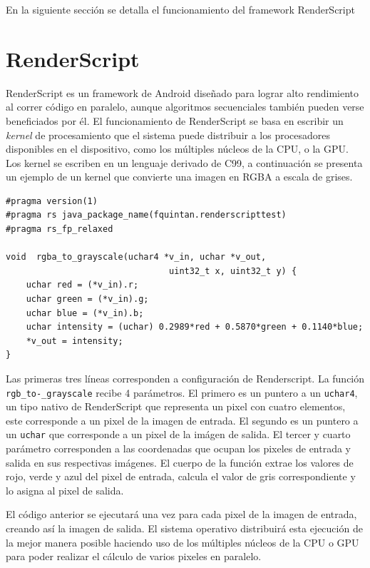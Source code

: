 En la siguiente sección se detalla el funcionamiento del framework RenderScript

\section{RenderScript}\label{renderscript}
RenderScript es un framework de Android diseñado para lograr alto rendimiento al correr código en paralelo, aunque algoritmos secuenciales también pueden verse beneficiados por él. El funcionamiento de RenderScript se basa en escribir un \emph{kernel} de procesamiento que el sistema puede distribuir a los procesadores disponibles en el dispositivo, como los múltiples núcleos de la CPU, o la GPU. 
Los kernel se escriben en un lenguaje derivado de C99, a continuación se presenta un ejemplo de un kernel que convierte una imagen en RGBA a escala de grises.

\begin{lstlisting}[style=CInputStyle]
#pragma version(1)
#pragma rs java_package_name(fquintan.renderscripttest)
#pragma rs_fp_relaxed

void  rgba_to_grayscale(uchar4 *v_in, uchar *v_out,
                                uint32_t x, uint32_t y) {
    uchar red = (*v_in).r;
    uchar green = (*v_in).g;
    uchar blue = (*v_in).b;
    uchar intensity = (uchar) 0.2989*red + 0.5870*green + 0.1140*blue;
    *v_out = intensity;
}
\end{lstlisting}

Las primeras tres líneas corresponden a configuración de Renderscript. La función \texttt{\justify rgb\_to-\_grayscale} recibe 4 parámetros. El primero es un puntero a un \texttt{uchar4}, un tipo nativo de RenderScript que representa un pixel con cuatro elementos, este corresponde a un pixel de la imagen de entrada. El segundo es un puntero a un \texttt{uchar} que corresponde a un pixel de la imágen de salida. El tercer y cuarto parámetro corresponden a las coordenadas que ocupan los pixeles de entrada y salida en sus respectivas imágenes. El cuerpo de la función extrae los valores de rojo, verde y azul del pixel de entrada, calcula el valor de gris correspondiente y lo asigna al pixel de salida.

El código anterior se ejecutará una vez para cada pixel de la imagen de entrada, creando así la imagen de salida. El sistema operativo distribuirá esta ejecución de la mejor manera posible haciendo uso de los múltiples núcleos de la CPU o GPU para poder realizar el cálculo de varios pixeles en paralelo.

